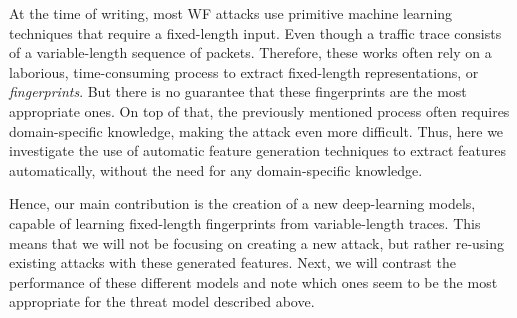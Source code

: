 At the time of writing, most WF attacks use primitive machine learning techniques that require a fixed-length input.
Even though a traffic trace consists of a variable-length sequence of packets.
Therefore, these works often rely on a laborious, time-consuming process to extract fixed-length representations, or \textit{fingerprints}.
But there is no guarantee that these fingerprints are the most appropriate ones.
On top of that, the previously mentioned process often requires domain-specific knowledge, making the attack even more difficult.
Thus, here we investigate the use of automatic feature generation techniques to extract features automatically, without the need for any domain-specific knowledge.

Hence, our main contribution is the creation of a new deep-learning models, capable of learning fixed-length fingerprints from variable-length traces.
This means that we will not be focusing on creating a new attack, but rather re-using existing attacks with these generated features.
Next, we will contrast the performance of these different models and note which ones seem to be the most appropriate for the threat model described above.

